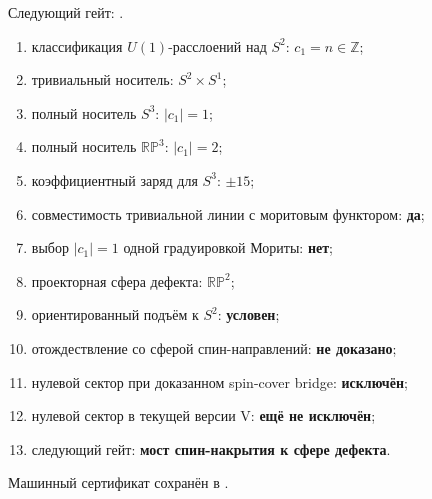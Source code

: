 Следующий гейт:
.

\begin{protocol}
\begin{enumerate}
 \item классификация $U(1)$-расслоений над $S^2$: \textbf{$c_1=n\in\mathbb Z$};
 \item тривиальный носитель: \textbf{$S^2\times S^1$};
 \item полный носитель $S^3$: \textbf{$|c_1|=1$};
 \item полный носитель $\mathbb{RP}^3$: \textbf{$|c_1|=2$};
 \item коэффициентный заряд для $S^3$: \textbf{$\pm15$};
 \item совместимость тривиальной линии с моритовым функтором:
 \textbf{да};
 \item выбор $|c_1|=1$ одной градуировкой Мориты: \textbf{нет};
 \item проекторная сфера дефекта: \textbf{$\mathbb{RP}^2$};
 \item ориентированный подъём к $S^2$: \textbf{условен};
 \item отождествление со сферой спин-направлений: \textbf{не доказано};
 \item нулевой сектор при доказанном spin-cover bridge: \textbf{исключён};
 \item нулевой сектор в текущей версии V: \textbf{ещё не исключён};
 \item следующий гейт: \textbf{мост спин-накрытия к сфере дефекта}.
\end{enumerate}
\end{protocol}

Машинный сертификат сохранён в
.